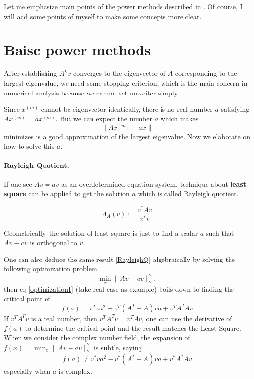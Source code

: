 \documentclass[12pt]{article}
\begin{document}
Let me emphasize main points of the power methods described in \cite{borm2012numerical}.
Of course, I will add some points of myself to make some concepts more clear.


\section{Baisc power methods}
After establishing $A^{k}x$ converges to the eigenvector of $A$ corresponding to the largest eigenvalue, 
we need some stopping criterion, which is the main concern in numerical analysis because we cannot set max\textunderscore eiter simply. 

Since $x^{(m)}$ cannot be eigenvector identically, there is no real number $a$ satisfying $Ax^{(m)} = ax^{(m)}$. 
But we can expect the number $a$ which makes
$$
\|A x^{(m)}-ax\| 
$$
minimizes is a good approximation of the largest eigenvalue. Now we elaborate on how to solve this $a$.

\paragraph{Rayleigh Quotient.} If one see $Av = av$ as an overdetermined equation system, technique about \textbf{least square} can be applied
to get the solution $a$ which is called Rayleigh quotient.

\begin{equation}
    \label{RayleighQ}
    \Lambda_{A}(v) := \frac{v^{*}Av}{v^{*}v}
\end{equation}

Geometrically, the solution of least square is just to find a scalar $a$ such that $Av-av$ is orthogonal to $v$.

\begin{tcolorbox}[colback=gray!10, colframe=black, title=Rayleigh quotient]
    One can also deduce the same result \eqref{RayleighQ} algebraically by solving the following optimization problem
    \begin{equation}
        \label{optimization1}
        \operatorname{min}_{x} \|Av-a v\|_{2}^{2},
    \end{equation}
    then eq \eqref{optimization1} (take real case as example) boils down to finding the critical point of
    $$
    f(a)=v^{T}v a^{2}- v^{T}(A^{T}+A)v a+v^{T}A^{T}Av
    $$
    If $v^{T}A^{T}v$ is a real number, then $v^{T}A^{T}v = v^{T}Av$, one can use the derivative of $f(a)$ to determine the critical point and the result matches the Least Square. 
    When we consider the complex number field, the expansion of $f(x)=\operatorname{min}_{x} \|Av-a v\|_{2}^{2}$ is subtle, saying
    $$
    f(a)\neq v^{*}v a^{2}- v^{*}(A^{*}+A)v a+v^{*}A^{*}Av
    $$
    especially when $a$ is complex.
    \end{tcolorbox}
\end{document}
